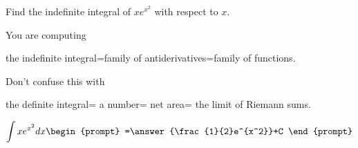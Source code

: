 \documentclass{ximera}
\author{Gregory Hartman \and Matthew Carr\and Nela Lakos}
\begin{document}
\begin{exercise}

Find the indefinite integral of $xe^{x^2}$ with respect to $x$.
\begin{hint}
You are computing 

the indefinite integral=family of antiderivatives=family of functions.

Don't confuse this with

 the definite integral= a number= net area= the limit of Riemann sums. 
\end{hint}
\[
\int xe^{x^2} dx
\begin{prompt}
=\answer{\frac{1}{2}e^{x^2}}+C
\end{prompt}
\]


\end{exercise}
\end{document}

